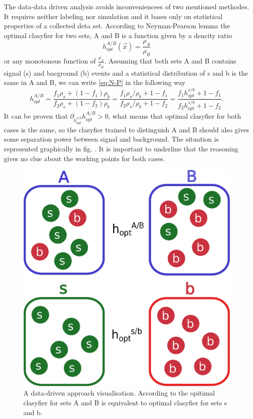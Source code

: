 The data-data driven analysis avoids inconveniencees of two mentioned methodes. It requires neither labeling nor simulation and it bases only on statistical properties of a collected deta set. According to Neyman-Pearson lemma \cite{Neyman-Pearson} the optimal clasyfier for two sets, A and B is a function given by a dencity ratio
\begin{equation}
  \label{eq:N-P}
  h_{opt}^{A/B}(\vec x)=\frac{\rho_A}{\rho_B}
\end{equation}
or any monotonous function of $\frac{\rho_A}{\rho_B}$. Assuming that both sets A and B contains signal (s) and bacground (b) events and a statistical distribution of s and b is the same in A and B, we can write \eqref{eq:N-P} in the following way
\begin{equation}
  h^{A/B}_{opt}=\frac{f_1 \rho_s + (1-f_1) \rho_b}{f_2 \rho_s + (1-f_2) \rho_b}=\frac{f_1 \rho_s/\rho_b+1-f_1}{f_2 \rho_s/\rho_b+1-f_2}=\frac{f_1 h_{opt}^{s/b}+1-f_1}{f_2 h_{opt}^{s/b} +1-f_2}.
\end{equation}
It can be proven that $\partial_{h_{opt}^{s/b}}h_{opt}^{A/B} >0$, what means that optimal clasyfier for both cases is the same, so the clasyfier trained to distinguish A and B should also gives some separation power between signal and background. The situation is represented graphically in fig. \cite{fig:DD}.  It is important to underline that the reasoning gives no clue about the working points for both cases. 

\begin{figure}[h]
  \centering
  \includegraphics[width=0.5 \textwidth]{Chapter_NN/setAB.eps}
\caption{A data-driven approach visualisation. According to \cite{Metodiev_2017} the opitimal clasyfier for sets A and B is equivalent to optimal clasyfier for sets s and b.}
\label{fig:DD}
\end{figure}



